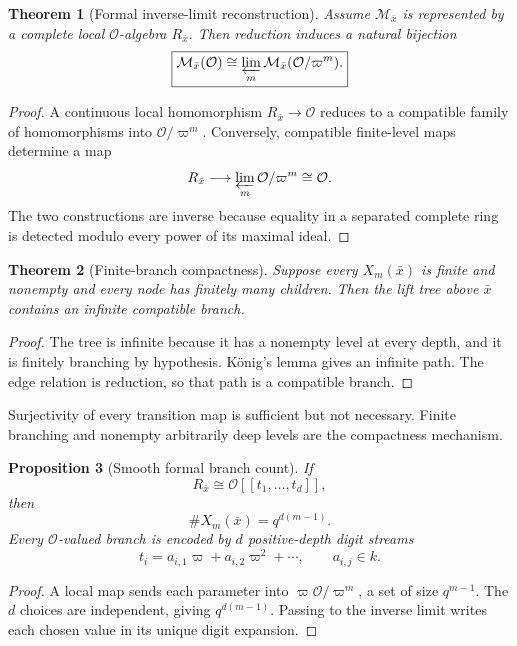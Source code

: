 \documentclass[11pt]{article}
\newtheorem{theorem}{Theorem}[section]
\newtheorem{proposition}[theorem]{Proposition}
\theoremstyle{definition}
\theoremstyle{remark}
\newcommand{\Ocal}{\mathcal O}
\begin{document}
\begin{theorem}[Formal inverse-limit reconstruction]
Assume \(\mathcal M_{\bar x}\) is represented by a complete local \(\Ocal\)-algebra \(R_{\bar x}\).  Then reduction induces a natural bijection
\[
\boxed{
\mathcal M_{\bar x}(\Ocal)
\cong
\varprojlim_m
\mathcal M_{\bar x}(\Ocal/\varpi^m).
}
\]
\end{theorem}

\begin{proof}
A continuous local homomorphism \(R_{\bar x}\to\Ocal\) reduces to a compatible family of homomorphisms into \(\Ocal/\varpi^m\).  Conversely, compatible finite-level maps determine a map
\[
R_{\bar x}\longrightarrow\varprojlim_m\Ocal/\varpi^m\cong\Ocal.
\]
The two constructions are inverse because equality in a separated complete ring is detected modulo every power of its maximal ideal.
\end{proof}

\begin{theorem}[Finite-branch compactness]
Suppose every \(X_m(\bar x)\) is finite and nonempty and every node has finitely many children.  Then the lift tree above \(\bar x\) contains an infinite compatible branch.
\end{theorem}

\begin{proof}
The tree is infinite because it has a nonempty level at every depth, and it is finitely branching by hypothesis.  K\"onig's lemma gives an infinite path.  The edge relation is reduction, so that path is a compatible branch.
\end{proof}

Surjectivity of every transition map is sufficient but not necessary.  Finite branching and nonempty arbitrarily deep levels are the compactness mechanism.

\begin{proposition}[Smooth formal branch count]
If
\[
R_{\bar x}\cong\Ocal[[t_1,\ldots,t_d]],
\]
then
\[
\boxed{
\#X_m(\bar x)=q^{d(m-1)}.
}
\]
Every \(\Ocal\)-valued branch is encoded by \(d\) positive-depth digit streams
\[
t_i=a_{i,1}\varpi+a_{i,2}\varpi^2+\cdots,
\qquad a_{i,j}\in k.
\]
\end{proposition}

\begin{proof}
A local map sends each parameter into \(\varpi\Ocal/\varpi^m\), a set of size \(q^{m-1}\).  The \(d\) choices are independent, giving \(q^{d(m-1)}\).  Passing to the inverse limit writes each chosen value in its unique digit expansion.
\end{proof}
\end{document}
